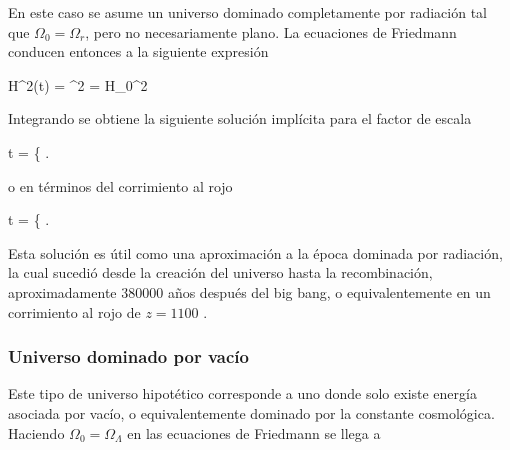 En este caso se asume un universo dominado completamente por radiación tal
que $\Omega_0 = \Omega_r$, pero no necesariamente plano. La ecuaciones de 
Friedmann conducen entonces a la siguiente expresión


{ H^2(t) = ^2 = H_0^2  }


Integrando se obtiene la siguiente solución implícita para el factor de 
escala


{ t = \left\{   \right. }


o en términos del corrimiento al rojo


{ t = \left\{   \right. }


Esta solución es útil como una aproximación a la época dominada por 
radiación, la cual sucedió desde la creación del universo hasta la 
recombinación, aproximadamente $380 000$ años después del big bang, o 
equivalentemente en un corrimiento al rojo de $z = 1100$ 
\cite{padmanabhan1995}.


			\subsubsection*{Universo dominado por vacío}
			
Este tipo de universo hipotético corresponde a uno donde solo existe 
energía asociada por vacío, o equivalentemente dominado por la constante 
cosmológica. Haciendo $\Omega_0 = \Omega_\Lambda$ en las ecuaciones de 
Friedmann se llega a 


